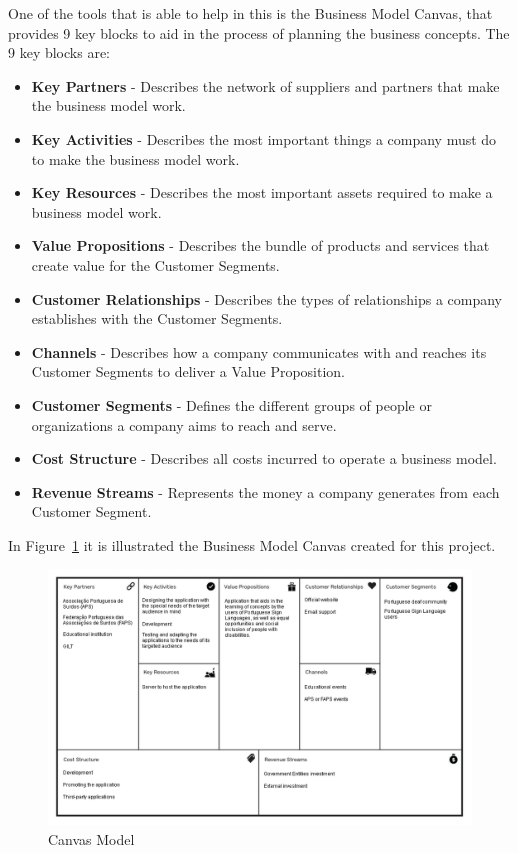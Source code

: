 One of the tools that is able to help in this is the Business Model Canvas\cite{osterwalder2010business}, that provides 9 key blocks to aid in the process of planning the business concepts.
The 9 key blocks are:

\begin{itemize}
    \item \textbf{Key Partners} - Describes the network of suppliers and partners that make the business model work.
    \item \textbf{Key Activities} - Describes the most important things a company must do to make the business model work.
    \item \textbf{Key Resources} - Describes the most important assets required to make a business model work.
    \item \textbf{Value Propositions} - Describes the bundle of products and services that create value for the Customer Segments.
    \item \textbf{Customer Relationships} - Describes the types of relationships a company establishes with the Customer Segments.
    \item \textbf{Channels} - Describes how a company communicates with and reaches its Customer Segments to deliver a Value Proposition.
    \item \textbf{Customer Segments} - Defines the different groups of people or organizations a company aims to reach and serve.
    \item \textbf{Cost Structure} - Describes all costs incurred to operate a business model.
    \item \textbf{Revenue Streams} - Represents the money a company generates from each Customer Segment.
\end{itemize}

In Figure~\ref{fig:CANVAS} it is illustrated the Business Model Canvas created for this project.

\begin{figure}[H]
\centering
\includegraphics[width=\textwidth,keepaspectratio]{ch3/assets/CANVAS.png}
\caption[Canvas Model]{Canvas Model}
\label{fig:CANVAS}
\end{figure}

